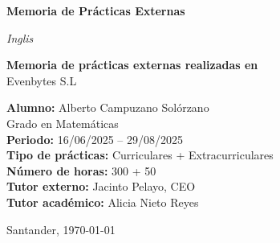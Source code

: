 \begin{titlepage}
\begin{center}
{\Huge \textbf{Memoria de Prácticas Externas}}

\vspace{0.5cm}

{\large \textit{Inglis}}

\vspace{1cm}

\textbf{Memoria de prácticas externas realizadas en}\\[0.5cm]
{\large Evenbytes S.L}

\vfill

\textbf{Alumno:} Alberto Campuzano Solórzano \\
Grado en Matemáticas \\[0.3cm]
\textbf{Periodo:} 16/06/2025 – 29/08/2025 \\
\textbf{Tipo de prácticas:} Curriculares + Extracurriculares \\
\textbf{Número de horas:} 300 + 50 \\[0.5cm]
\textbf{Tutor externo:} Jacinto Pelayo, CEO \\
\textbf{Tutor académico:} Alicia Nieto Reyes

\vspace{1cm}

Santander, \today

\end{center}
\end{titlepage}